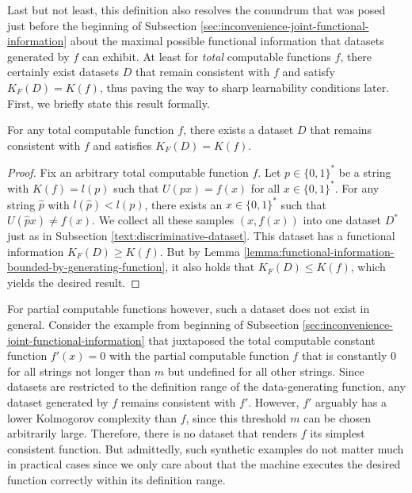 Last but not least, this definition also resolves the conundrum that was posed just before the beginning of Subsection \ref{sec:inconvenience-joint-functional-information} about the maximal possible functional information that datasets generated by $f$ can exhibit.
At least for \textit{total} computable functions $f$, there certainly exist datasets $D$ that remain consistent with $f$ and satisfy $K_F(D)=K(f)$, thus paving the way to sharp learnability conditions later.
First, we briefly state this result formally.
\begin{lemma}
	\label{lemma:maximal-function-information}
	For any total computable function $f$, there exists a dataset $D$ that remains consistent with $f$ and satisfies $K_F(D)=K(f)$.
\end{lemma}
\begin{proof}
	Fix an arbitrary total computable function $f$.
	Let $p\in\{0,1\}^{*}$ be a string with $K(f)=l(p)$ such that $U(px)=f(x)$ for all $x\in\{0,1\}^{*}$. 
	For any string $\hat{p}$ with $l(\hat{p})<l(p)$, there exists an $x\in\{0,1\}^{*}$ such that $U(\hat{p}x)\neq f(x)$.
	We collect all these samples $(x,f(x))$ into one dataset $D^{*}$ just as in Subsection \ref{text:discriminative-dataset}.
	This dataset has a functional information $K_F(D)\geq K(f)$.
	But by Lemma \ref{lemma:functional-information-bounded-by-generating-function}, it also holds that $K_F(D)\leq K(f)$, which yields the desired result.
\end{proof}
For partial computable functions however, such a dataset does not exist in general.
Consider the example from beginning of Subsection \ref{sec:inconvenience-joint-functional-information} that juxtaposed the total computable constant function $f'(x)=0$ with the partial computable function $f$ that is constantly $0$ for all strings not longer than $m$ but undefined for all other strings.
Since datasets are restricted to the definition range of the data-generating function, any dataset generated by $f$ remains consistent with $f'$.
However, $f'$ arguably has a lower Kolmogorov complexity than $f$, since this threshold $m$ can be chosen arbitrarily large.
Therefore, there is no dataset that renders $f$ its simplest consistent function.
But admittedly, such synthetic examples do not matter much in practical cases since we only care about that the machine executes the desired function correctly within its definition range.

